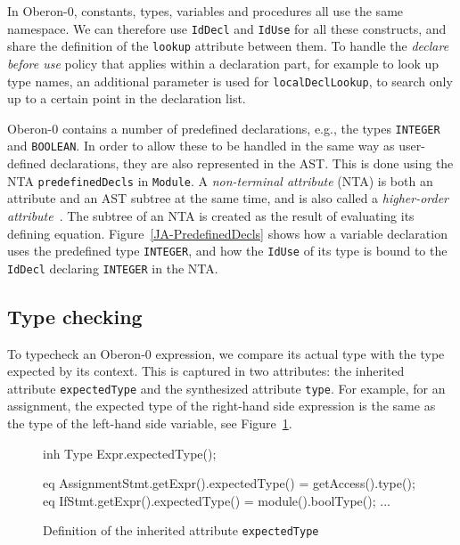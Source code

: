 In Oberon-0, constants, types, variables and procedures all use the same namespace. 
We can therefore use \texttt{IdDecl} and \texttt{IdUse} for all these
constructs, and share the definition of the \texttt{lookup} attribute between them.
To handle the \emph{declare before use} policy that applies within a declaration part, for example to look up type names, an additional parameter is used for \texttt{localDeclLookup}, to search only up to a certain point in the declaration list.

Oberon-0 contains a number of predefined declarations, e.g., the types \texttt{INTEGER} and \texttt{BOOLEAN}. In order to allow these to be handled in the same way as user-defined declarations, they are also represented in the AST. This is done using the NTA \texttt{predefinedDecls} in \texttt{Module}. A \emph{non-terminal attribute} (NTA) is both an attribute and an AST subtree at the same time, and is also called a \emph{higher-order attribute}~\cite{vogt89pldi}. The subtree of an NTA is created as the result of evaluating its defining equation. Figure~\ref{JA-PredefinedDecls} shows how a variable declaration uses the predefined type \texttt{INTEGER}, and how the \texttt{IdUse} of its type is bound to the \texttt{IdDecl} declaring \texttt{INTEGER} in the NTA.


%
%
\subsection{Type checking}
\label{JA-TypeChecking}

To typecheck an Oberon-0 expression, we compare its actual type with the type expected by its context. This is captured in two attributes: the inherited attribute \texttt{expectedType} and the synthesized attribute \texttt{type}. For example, for an assignment, the expected type of the right-hand side expression is the same as the type of the left-hand side variable, see Figure~\ref{JA-ExpectedType}.

\begin{figure}[h]
\begin{jastaddcode}
inh Type Expr.expectedType();

eq AssignmentStmt.getExpr().expectedType() = getAccess().type();
eq IfStmt.getExpr().expectedType() = module().boolType();
...
\end{jastaddcode}
\vspace{-15pt}
\caption{Definition of the inherited attribute \texttt{expectedType}}
\label{JA-ExpectedType}
\end{figure}

